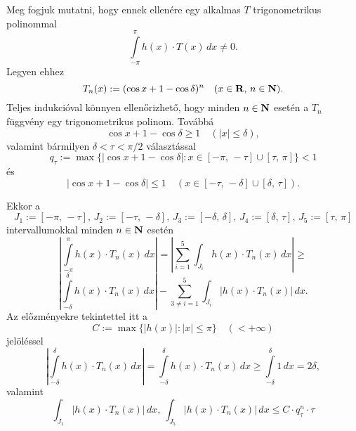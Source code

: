 Meg fogjuk mutatni, hogy ennek ellenére egy alkalmas $T$ trigonometrikus polinommal
\[
	\int\limits_{-\pi}^\pi h(x) \cdot T(x) \, dx \neq 0.
\]
Legyen ehhez
\[
	T_n(x) := (\cos x + 1 - \cos \delta)^n \quad (x \in \mathbf{R}, \, n \in \mathbf{N}).
\]
Teljes indukcióval könnyen ellenőrizhető, hogy minden $n \in \mathbf{N}$ esetén a $T_n$ függvény egy trigonometrikus polinom. Továbbá
\[
	\cos x + 1 - \cos \delta \geq 1 \quad (|x| \leq \delta),
\]
valamint bármilyen $\delta < \tau < \pi / 2$ választással
\[
	q_\tau := \max \{ |\cos x + 1 - \cos \delta| : x \in [-\pi, \, -\tau] \cup [\tau, \, \pi]\} < 1
\]
és
\[
	|\cos x + 1 - \cos \delta| \leq 1 \quad (x \in [-\tau, \, -\delta] \cup [\delta, \, \tau]).
\]

\begin{center}
\end{center}
Ekkor a
\[
	J_1 := [-\pi, \, -\tau], \, J_2 := [-\tau, \, -\delta], \, J_3 := [-\delta, \, \delta], \, J_4 := [\delta, \, \tau], \, J_5 := [\tau, \, \pi]
\]
intervallumokkal minden $n \in \mathbf{N}$ esetén
\[
	\left| \int\limits_{-\pi}^\pi h(x) \cdot T_n(x) \, dx \right| = \left| \sum_{i=1}^5 \int_{J_i} h(x) \cdot T_n(x) \, dx\right| \geq
\]
\[
	\left| \int\limits_{-\delta}^\delta h(x) \cdot T_n(x) \, dx \right| - \sum_{3 \neq i = 1}^5 \int_{J_i} |h(x) \cdot T_n(x)| \, dx.
\]
Az előzményekre tekintettel itt a
\[
	C := \max \{ |h(x)| : |x| \leq \pi \} \quad (< + \infty)
\]
jelöléssel
\[
	\left| \int\limits_{-\delta}^\delta h(x) \cdot T_n(x) \, dx \right| = \int\limits_{-\delta}^\delta h(x) \cdot T_n(x) \, dx \geq \int\limits_{-\delta}^\delta 1 \, dx = 2\delta,
\]
valamint
\[
	\int_{J_1} |h(x) \cdot T_n(x)| \, dx, \, \int_{J_5} |h(x) \cdot T_n(x)| \, dx \leq C \cdot q_\tau^n \cdot \tau
\]
